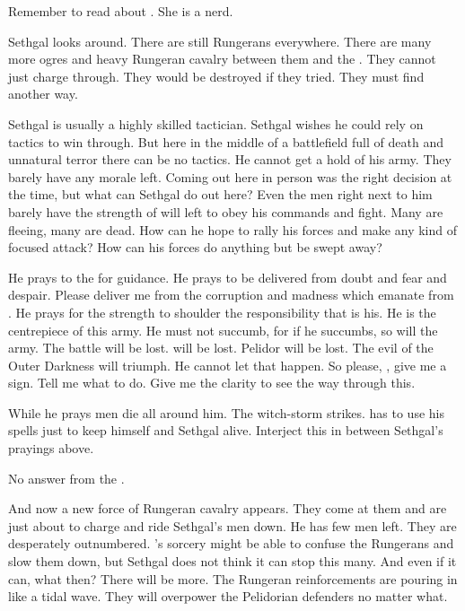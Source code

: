 Remember to read about \Esmerel. 
She is a nerd. 





\begin{comment}
  \subsection{Imetrians come to the rescue}
\end{comment}
Sethgal looks around. 
There are still Rungerans everywhere. 
There are many more ogres and heavy Rungeran cavalry between them and the \ishrah.
They cannot just charge through. 
They would be destroyed if they tried. 
They must find another way. 

Sethgal is usually a highly skilled tactician.
Sethgal wishes he could rely on tactics to win through. 
But here in the middle of a battlefield full of death and unnatural terror there can be no tactics. 
He cannot get a hold of his army. 
They barely have any morale left. 
Coming out here in person was the right decision at the time, but what can Sethgal do out here?
Even the men right next to him barely have the strength of will left to obey his commands and fight. 
Many are fleeing, many are dead. 
How can he hope to rally his forces and make any kind of focused attack?
How can his forces do anything but be swept away? 

He prays to the \sephiroth for guidance. 
He prays to be delivered from doubt and fear and despair.
Please deliver me from the corruption and madness which emanate from \Isphet. 
He prays for the strength to shoulder the responsibility that is his. 
He is the centrepiece of this army.
He must not succumb, for if he succumbs, so will the army.
The battle will be lost. 
\Forclin will be lost.
Pelidor will be lost.
The evil of the Outer Darkness will triumph.
He cannot let that happen.
So please, \sephiroth, give me a sign.
Tell me what to do.
Give me the clarity to see the way through this. 

While he prays men die all around him. 
The witch-storm strikes. 
\Shachar has to use his spells just to keep himself and Sethgal alive. 
Interject this in between Sethgal's prayings above. 

No answer from the \sephiroth. 

And now a new force of Rungeran cavalry appears.
They come at them and are just about to charge and ride Sethgal's men down.
He has few men left.
They are desperately outnumbered.
\Shachar's sorcery might be able to confuse the Rungerans and slow them down, but Sethgal does not think it can stop this many. 
And even if it can, what then? 
There will be more. 
The Rungeran reinforcements are pouring in like a tidal wave. 
They will overpower the Pelidorian defenders no matter what. 

